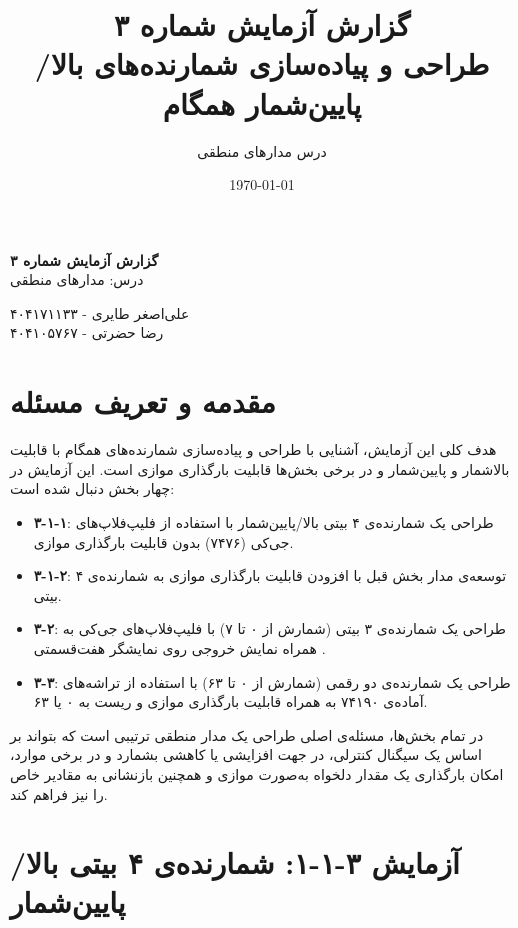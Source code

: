 \documentclass[12pt,a4paper]{article}
\title{گزارش آزمایش شماره ۳ \\ \large طراحی و پیاده‌سازی شمارنده‌های بالا/پایین‌شمار همگام}
\author{درس مدارهای منطقی}
\date{\today}
\begin{document}
\begin{titlepage}
	\centering
	\vspace*{2cm}
	{\Huge \textbf{گزارش آزمایش شماره ۳}}\\[0.5cm]
	{\large درس: مدارهای منطقی}\\[0.5cm]
	\vspace{1.5cm}

	{\large
	علی‌اصغر طایری - ۴۰۴۱۷۱۱۳۳ \\[0.3cm]
	رضا حضرتی - ۴۰۴۱۰۵۷۶۷
	}
	\vfill
\end{titlepage}

\tableofcontents
\newpage


\section{مقدمه و تعریف مسئله}

هدف کلی این آزمایش، آشنایی با طراحی و پیاده‌سازی شمارنده‌های همگام  با قابلیت بالا‌شمار و پایین‌شمار  و در برخی بخش‌ها قابلیت بارگذاری موازی  است. این آزمایش در چهار بخش دنبال شده است:

\begin{itemize}[rightmargin=0pt]
	\item \textbf{۳-۱-۱}: طراحی یک شمارنده‌ی ۴ بیتی بالا/پایین‌شمار با استفاده از فلیپ‌فلاپ‌های جی‌کی (۷۴۷۶) بدون قابلیت بارگذاری موازی.
	\item \textbf{۳-۱-۲}: توسعه‌ی مدار بخش قبل با افزودن قابلیت بارگذاری موازی  به شمارنده‌ی ۴ بیتی.
	\item \textbf{۳-۲}: طراحی یک شمارنده‌ی ۳ بیتی (شمارش از ۰ تا ۷) با فلیپ‌فلاپ‌های جی‌کی به همراه نمایش خروجی روی نمایشگر هفت‌قسمتی .
	\item \textbf{۳-۳}: طراحی یک شمارنده‌ی دو رقمی  (شمارش از ۰ تا ۶۳) با استفاده از تراشه‌های آماده‌ی ۷۴۱۹۰ به همراه قابلیت بارگذاری موازی و ریست به ۰ یا ۶۳.
\end{itemize}

در تمام بخش‌ها، مسئله‌ی اصلی طراحی یک مدار منطقی ترتیبی است که بتواند بر اساس یک سیگنال کنترلی، در جهت افزایشی یا کاهشی بشمارد و در برخی موارد، امکان بارگذاری یک مقدار دلخواه به‌صورت موازی و همچنین بازنشانی  به مقادیر خاص را نیز فراهم کند.

\newpage

\section{آزمایش ۳-۱-۱: شمارنده‌ی ۴ بیتی بالا/پایین‌شمار}
\end{document}
